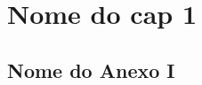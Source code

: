\documentclass[
	oldfontcommands,
	sumario=tradicional,
	12pt,      %
	openright, %
	oneside,   %
	a4paper,   %
	english, %
	brazil   %
	]{00-configs/imecc-unicamp}
\begin{document}
		\chapter{Nome do cap 1} \label{cap_ideia_do_nome}
		
		
		

		\postextual


	
	\begin{anexosenv} %
		\partanexos
		
		\chapter{Nome do Anexo I} \label{A_ideia_do_nome_do_anexoI}
		
		
			
	\end{anexosenv}
\end{document}
